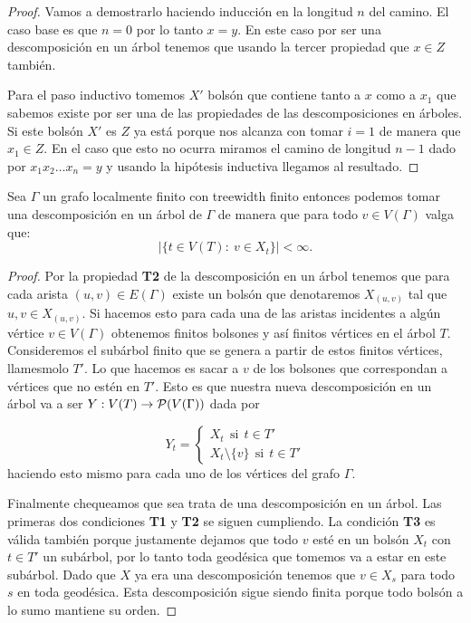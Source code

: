 \documentclass[tesis.tex]{subfiles}
\begin{document}
\begin{proof}	
	Vamos a demostrarlo haciendo inducción en la longitud $n$ del camino. 
	El caso base es que $n = 0$ por lo tanto $x=y$. 
	En este caso por ser una descomposición en un árbol tenemos que usando la tercer propiedad que $x \in Z$ también.
	
	Para el paso inductivo tomemos $X'$ bolsón que contiene tanto a $x$ como a $x_1$ que sabemos existe por ser una de las propiedades de las descomposiciones en árboles.
	Si este bolsón $X'$ es $Z$ ya está porque nos alcanza con tomar $i=1$ de manera que $x_1 \in Z$.
	En el caso que esto no ocurra miramos el camino de longitud $n-1$ dado por $x_1 x_2 \dots x_n = y$ y usando la hipótesis inductiva llegamos al resultado.	
\end{proof}

\begin{prop}\label{prop_tw_finitos_bolsones}
	Sea $\Gamma$ un grafo localmente finito con treewidth finito entonces podemos tomar una descomposición en un árbol de $\Gamma$ de manera que para todo $v \in V(\Gamma)$ valga que:
	\[
		| \{  t \in V(T) : \ v \in X_t  \} | < \infty.
	\]
\end{prop}
\begin{proof}
	Por la propiedad \textbf{T2} de la descomposición en un árbol tenemos que para cada arista $(u,v) \in E(\Gamma)$ existe un bolsón que denotaremos $X_{(u,v)}$ tal que $u,v \in X_{(u,v)}$.
	Si hacemos esto para cada una de las aristas incidentes a algún vértice $v \in V(\Gamma)$ obtenemos finitos bolsones y así finitos vértices en el árbol $T$.
	Consideremos el subárbol finito que se genera a partir de estos finitos vértices, llamesmolo $T'$.
	Lo que hacemos es sacar a $v$ de los bolsones que correspondan a vértices que no estén en $T'$.
	Esto es que nuestra nueva descomposición en un árbol va a ser $Y: V(T) \to {\cal P}(V(\Gamma))$ dada por 
	
	\[
	Y_t = 
	\begin{cases}
  		X_t  \ \  \text{si} \ \  t \in T' \\
  		X_t \setminus \{  v \} \ \  \text{si} \ \  t \in T'
	\end{cases}
	\]
	haciendo esto mismo para cada uno de los vértices del grafo $\Gamma$.
	
	Finalmente chequeamos que sea trata de una descomposición en un árbol.
	Las primeras dos condiciones \textbf{T1} y \textbf{T2} se siguen cumpliendo.
	La condición \textbf{T3} es válida también porque justamente dejamos que todo $v$ esté en un bolsón $ X_t$ con $t \in T'$ un subárbol, por lo tanto toda geodésica que tomemos va a estar en este subárbol.
	Dado que $X$ ya era una descomposición tenemos que $v \in X_s$ para todo $s$ en toda geodésica.
	Esta descomposición sigue siendo finita porque todo bolsón a lo sumo mantiene su orden.	
\end{proof}
\end{document}
